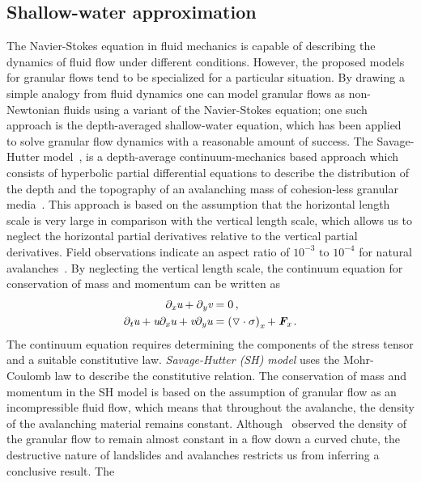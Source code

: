 \subsection{Shallow-water approximation}
The Navier-Stokes equation in fluid mechanics is capable of describing the 
dynamics of fluid flow under different conditions. However, the proposed models 
for granular flows tend to be specialized for a particular situation. By 
drawing a simple analogy from fluid dynamics one can model granular flows as 
non-Newtonian fluids using a variant of the Navier-Stokes equation; one such 
approach is the depth-averaged shallow-water equation, which has been applied 
to solve granular flow dynamics with a reasonable amount of success. The 
Savage-Hutter model~\citep{Savage1991}, is a depth-average continuum-mechanics 
based approach which consists of hyperbolic partial differential equations to 
describe the distribution of the depth and the topography of an avalanching 
mass of cohesion-less granular media~\citep{Hutter2005}. This approach is based 
on the assumption that the horizontal length scale is very large in comparison 
with the vertical length scale, which allows us to neglect the horizontal 
partial derivatives relative to the vertical partial derivatives. Field 
observations indicate an aspect ratio of $10^{-3} \mbox{ to } 10^{-4}$ for 
natural avalanches~\citep{Cawthor2006a}. By neglecting the vertical length 
scale, the continuum equation for conservation of mass and momentum can be 
written as
%
\begin{align}
 \partial_{\textit{x}}\textit{u}+\partial_{\textit{y}}\textit{v}& =0 \,,\\
 \partial_{\textit{t}}\textit{u}+\textit{u}\partial_{\textit{x}}\textit{u} + 
\textit{v}\partial_{\textit{y}}\textit{u} & =\left(\triangledown \cdot \sigma 
\right)_{\textit{x}} +\textit{\textbf{F}}_{\textit{x}} \,.
\end{align}
%
The continuum equation requires determining the components of the stress tensor 
and a suitable constitutive law. \textit{Savage-Hutter (SH) model} uses the 
Mohr-Coulomb law to describe the constitutive relation. The conservation of 
mass and momentum in the SH model is based on the assumption of granular flow 
as an incompressible fluid flow, which means that throughout the avalanche, the 
density of the avalanching material remains constant. 
Although~\citet{Hutter1995} observed the density of the granular flow to remain 
almost constant in a flow down a curved chute, the destructive nature of 
landslides and avalanches restricts us from inferring a conclusive result. The 
